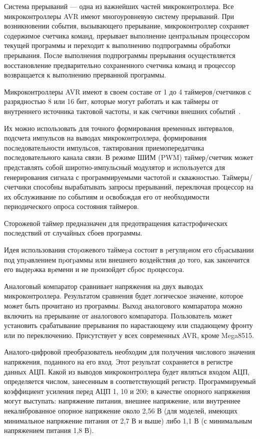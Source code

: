 \documentclass[12pt, oneside]{altsu-report}
\begin{document}
Система прерываний --- одна из важнейших частей микроконтроллера. Все микроконтроллеры AVR имеют многоуровневую систему прерываний. При возникновении события, вызывающего прерывание, микроконтроллер сохраняет содержимое счетчика команд, прерывает выполнение центральным процессором текущей программы и переходит к выполнению подпрограммы обработки прерывания. После выполнения подпрограммы прерывания осуществляется восстановление предварительно сохраненного счетчика команд и процессор возвращается к выполнению прерванной программы.

Микроконтроллеры AVR имеют в своем составе от 1 до 4 таймеров/счетчиков с разрядностью 8 или 16 бит, которые могут работать и как таймеры от внутреннего источника тактовой частоты, и как счетчики внешних событий~\cite{AVR_2014}.

Их можно использовать для точного формирования временных интервалов, подсчета импульсов на выводах микроконтроллера, формирования последовательности импульсов, тактирования приемопередатчика последовательного канала связи. В режиме ШИМ (PWM) таймер/счетчик может представлять собой широтно-импульсный модулятор и используется для генерирования сигнала с программируемыми частотой и скважностью. Таймеры/счетчики способны вырабатывать запросы прерываний, переключая процессор на их обслуживание по событиям и освобождая его от необходимости периодического опроса состояния таймеров.

Сторожевой таймер предназначен для предотвращения катастрофических последствий от случайных сбоев программы.

Идея использования стоpожевого таймеpа состоит в pегуляpном его сбpасывании под упpавлением пpогpаммы или внешнего воздействия до того, как закончится его выдеpжка вpемени и не пpоизойдет сбpос пpоцессоpа.

Аналоговый компаратор сравнивает напряжения на двух выводах микроконтроллера. Результатом сравнения будет логическое значение, которое может быть прочитано из программы. Выход аналогового компаратора можно включить на прерывание от аналогового компаратора. Пользователь может установить срабатывание прерывания по нарастающему или спадающему фронту или по переключению. Присутствует у всех современных AVR, кроме Mega8515.

Аналого-цифровой преобразователь необходим для получения числового значения напряжения, поданного на его вход. Этот результат сохраняется в регистре данных АЦП. Какой из выводов микроконтроллера будет являться входом АЦП, определяется числом, занесенным в соответствующий регистр. Программируемый коэффициент усиления перед АЦП 1, 10 и 200; в качестве опорного напряжения могут выступать: напряжение питания, внешнее напряжение, или внутреннее некалиброванное опорное напряжение около 2,56 В (для моделей, имеющих минимальное напряжение питания от 2,7 В и выше) либо 1,1 В (с минимальным напряжением питания 1,8 В).
\end{document}
